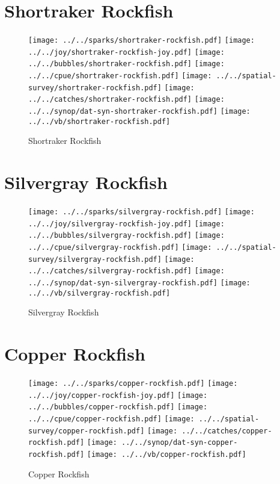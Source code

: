 \section{Shortraker Rockfish}

\begin{figure}[htbp]
\centering
\texttt{[image: ../../sparks/shortraker-rockfish.pdf]}
\texttt{[image: ../../joy/shortraker-rockfish-joy.pdf]}
\texttt{[image: ../../bubbles/shortraker-rockfish.pdf]}
\texttt{[image: ../../cpue/shortraker-rockfish.pdf]}
\texttt{[image: ../../spatial-survey/shortraker-rockfish.pdf]}
\texttt{[image: ../../catches/shortraker-rockfish.pdf]}
\texttt{[image: ../../synop/dat-syn-shortraker-rockfish.pdf]}
\texttt{[image: ../../vb/shortraker-rockfish.pdf]}
\caption{Shortraker Rockfish}
\end{figure}
\clearpage
\section{Silvergray Rockfish}

\begin{figure}[htbp]
\centering
\texttt{[image: ../../sparks/silvergray-rockfish.pdf]}
\texttt{[image: ../../joy/silvergray-rockfish-joy.pdf]}
\texttt{[image: ../../bubbles/silvergray-rockfish.pdf]}
\texttt{[image: ../../cpue/silvergray-rockfish.pdf]}
\texttt{[image: ../../spatial-survey/silvergray-rockfish.pdf]}
\texttt{[image: ../../catches/silvergray-rockfish.pdf]}
\texttt{[image: ../../synop/dat-syn-silvergray-rockfish.pdf]}
\texttt{[image: ../../vb/silvergray-rockfish.pdf]}
\caption{Silvergray Rockfish}
\end{figure}
\clearpage
\section{Copper Rockfish}

\begin{figure}[htbp]
\centering
\texttt{[image: ../../sparks/copper-rockfish.pdf]}
\texttt{[image: ../../joy/copper-rockfish-joy.pdf]}
\texttt{[image: ../../bubbles/copper-rockfish.pdf]}
\texttt{[image: ../../cpue/copper-rockfish.pdf]}
\texttt{[image: ../../spatial-survey/copper-rockfish.pdf]}
\texttt{[image: ../../catches/copper-rockfish.pdf]}
\texttt{[image: ../../synop/dat-syn-copper-rockfish.pdf]}
\texttt{[image: ../../vb/copper-rockfish.pdf]}
\caption{Copper Rockfish}
\end{figure}
\clearpage
